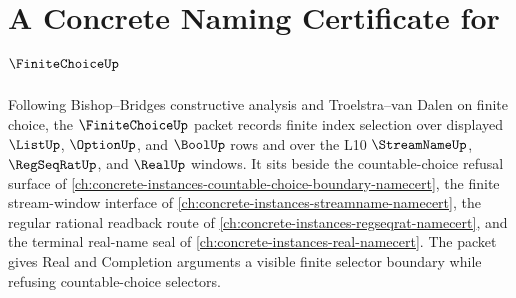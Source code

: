 \chapter{A Concrete Naming Certificate for $\FiniteChoiceUp$}
\label{ch:concrete-instances-finitechoice-namecert}

Following Bishop--Bridges constructive analysis and Troelstra--van Dalen on finite choice, the $\FiniteChoiceUp$ packet records finite index selection over displayed $\ListUp$, $\OptionUp$, and $\BoolUp$ rows and over the L10 $\StreamNameUp$, $\RegSeqRatUp$, and $\RealUp$ windows. It sits beside the countable-choice refusal surface of \autoref{ch:concrete-instances-countable-choice-boundary-namecert}, the finite stream-window interface of \autoref{ch:concrete-instances-streamname-namecert}, the regular rational readback route of \autoref{ch:concrete-instances-regseqrat-namecert}, and the terminal real-name seal of \autoref{ch:concrete-instances-real-namecert}. The packet gives Real and Completion arguments a visible finite selector boundary while refusing countable-choice selectors.

